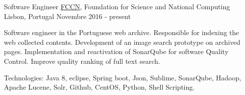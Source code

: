 


\begin{cventries}


\cventry
{Software Engineer} %
{\href{https://www.fccn.pt/en/}{FCCN}, Foundation for Science and National Computing} %
{Lisbon, Portugal} %
{Novembre 2016 - present} %
{ %
\begin{cvitems}
\item {Software engineer in the Portuguese web archive. Responsible for indexing the web collected contents. Development of an image search prototype on archived pages. Implementation and reactivation of SonarQube for software Quality Control. Improve quality ranking of full text search.}
\item {Technologies: Java 8, eclipse, Spring boot, Json, Sublime, SonarQube, Hadoop, Apache Lucene, Solr, Github, CentOS, Python, Shell Scripting.}
\end{cvitems}
}



\end{cventries}
